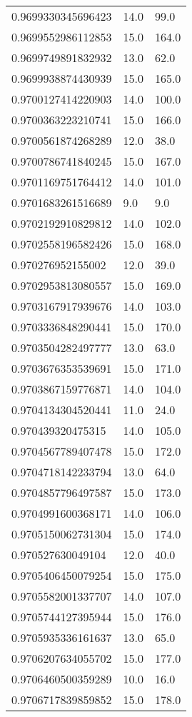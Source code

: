 \begin{center}
\begin{supertabular}[H]{p{0.30\textwidth}p{0.05\textwidth}p{0.05\textwidth}}
0.9699330345696423 & 14.0 & 99.0 \\ 
0.9699552986112853 & 15.0 & 164.0 \\ 
0.9699749891832932 & 13.0 & 62.0 \\ 
0.9699938874430939 & 15.0 & 165.0 \\ 
0.9700127414220903 & 14.0 & 100.0 \\ 
0.9700363223210741 & 15.0 & 166.0 \\ 
0.9700561874268289 & 12.0 & 38.0 \\ 
0.9700786741840245 & 15.0 & 167.0 \\ 
0.9701169751764412 & 14.0 & 101.0 \\ 
0.9701683261516689 & 9.0 & 9.0 \\ 
0.9702192910829812 & 14.0 & 102.0 \\ 
0.9702558196582426 & 15.0 & 168.0 \\ 
0.970276952155002 & 12.0 & 39.0 \\ 
0.9702953813080557 & 15.0 & 169.0 \\ 
0.9703167917939676 & 14.0 & 103.0 \\ 
0.9703336848290441 & 15.0 & 170.0 \\ 
0.9703504282497777 & 13.0 & 63.0 \\ 
0.9703676353539691 & 15.0 & 171.0 \\ 
0.9703867159776871 & 14.0 & 104.0 \\ 
0.9704134304520441 & 11.0 & 24.0 \\ 
0.970439320475315 & 14.0 & 105.0 \\ 
0.9704567789407478 & 15.0 & 172.0 \\ 
0.9704718142233794 & 13.0 & 64.0 \\ 
0.9704857796497587 & 15.0 & 173.0 \\ 
0.9704991600368171 & 14.0 & 106.0 \\ 
0.9705150062731304 & 15.0 & 174.0 \\ 
0.970527630049104 & 12.0 & 40.0 \\ 
0.9705406450079254 & 15.0 & 175.0 \\ 
0.9705582001337707 & 14.0 & 107.0 \\ 
0.9705744127395944 & 15.0 & 176.0 \\ 
0.9705935336161637 & 13.0 & 65.0 \\ 
0.9706207634055702 & 15.0 & 177.0 \\ 
0.9706460500359289 & 10.0 & 16.0 \\ 
0.9706717839859852 & 15.0 & 178.0 \\ 

\end{supertabular}
\end{center}
